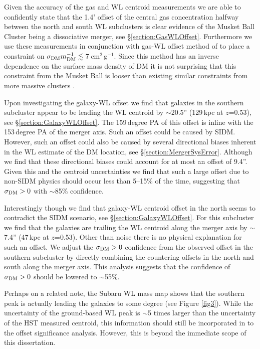 Given the accuracy of the gas and WL centroid measurements we are able to confidently state that the 1.4' offset of the central gas concentration halfway between the north and south WL subclusters is clear evidence of the Musket Ball Cluster being a dissociative merger, see \S\ref{section:GasWLOffset}.
Furthermore we use these measurements in conjunction with gas-WL offset method of \citet{Markevitch:2004dl} to place a constraint on $\sigma_{\rm DM} m_{\rm DM}^{-1} \lesssim 7$\,cm$^2$\,g$^{-1}$.
Since this method has an inverse dependence on the surface mass density of DM it is not surprising that this constraint from the Musket Ball is looser than existing similar constraints from more massive clusters \citep{Markevitch:2004dl, Bradac:2008gw, Merten:2011gu}.

Upon investigating the galaxy-WL offset we find that galaxies in the southern subcluster appear to be leading the WL centroid by $\sim$20.5'' (129\,kpc at $z$=0.53), see \S\ref{section:GalaxyWLOffset}.
The 159\,degree PA of this offset is inline with the 153\,degree PA of the merger axis.
Such an offset could be caused by SIDM.
However, such an offset could also be caused by several directional biases inherent in the WL estimate of the DM location, see \S\ref{section:MergerSysError}.
Although we find that these directional biases could account for at most an offset of 9.4''.
Given this and the centroid uncertainties we find that such a large offset due to non-SIDM physics should occur less than 5--15\% of the time, suggesting that $\sigma_{\rm DM}>0$ with $\sim$85\% confidence.

Interestingly though we find that galaxy-WL centroid offset in the north seems to contradict the SIDM scenario, see \S\ref{section:GalaxyWLOffset}.
For this subcluster we find that the galaxies are trailing the WL centroid along the merger axis by $\sim$7.4'' (47\,kpc at $z$=0.53).
Other than noise there is no physical explanation for such an offset.
We adjust the $\sigma_{\rm DM}>0$ confidence from the observed offset in the southern subcluster by directly combining the countering offsets in the north and south along the merger axis.
This analysis suggests that the confidence of $\sigma_{\rm DM}>0$ should be lowered to $\sim$55\%.

Perhaps on a related note, the Subaru WL mass map shows that the southern peak is actually leading the galaxies to some degree (see Figure \ref{fig3}). 
While the uncertainty of the ground-based WL peak is $\sim$5 times larger than the uncertainty of the HST measured centroid, this information should still be incorporated in to the offset significance analysis.
However, this is beyond the immediate scope of this dissertation.


